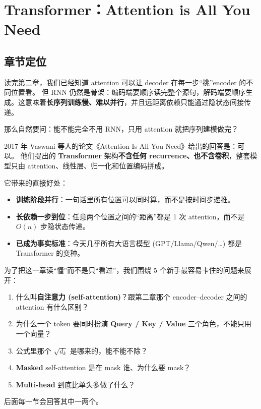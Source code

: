 \section{Transformer：Attention is All You Need}
\label{sec:ch03-transformer}

\subsection{章节定位}
\label{subsec:ch03-positioning}

\begin{problemblock}
读完第二章，我们已经知道 attention 可以让 decoder 在每一步“挑”encoder 的不同位置看。
但 RNN 仍然是骨架：编码端要顺序读完整个源句，解码端要顺序生成。这意味着\textbf{长序列训练慢、难以并行}，并且远距离依赖只能通过隐状态间接传递。

那么自然要问：能不能完全不用 RNN，只用 attention 就把序列建模做完？
\end{problemblock}

\begin{intuitionblock}
2017 年 Vaswani 等人的论文《Attention Is All You Need》给出的回答是：可以。
他们提出的 \textbf{Transformer} 架构\textbf{不含任何 recurrence、也不含卷积}，整套模型只由 attention、线性层、归一化和位置编码拼成。

它带来的直接好处：
\begin{itemize}
  \item \textbf{训练阶段并行}：一句话里所有位置可以同时算，而不是按时间步递推。
  \item \textbf{长依赖一步到位}：任意两个位置之间的“距离”都是 1 次 attention，而不是 $O(n)$ 步隐状态传递。
  \item \textbf{已成为事实标准}：今天几乎所有大语言模型 (GPT/Llama/Qwen/\ldots) 都是 Transformer 的变种。
\end{itemize}
\end{intuitionblock}

为了把这一章读“懂”而不是只“看过”，我们围绕 5 个新手最容易卡住的问题来展开：
\begin{enumerate}
  \item 什么叫\textbf{自注意力 (self-attention)}？跟第二章那个 encoder--decoder 之间的 attention 有什么区别？
  \item 为什么一个 token 要同时扮演 \textbf{Query / Key / Value} 三个角色，不能只用一个向量？
  \item 公式里那个 $\sqrt{d_k}$ 是哪来的，能不能不除？
  \item \textbf{Masked} self-attention 是在 mask 谁、为什么要 mask？
  \item \textbf{Multi-head} 到底比单头多做了什么？
\end{enumerate}
后面每一节会回答其中一两个。

